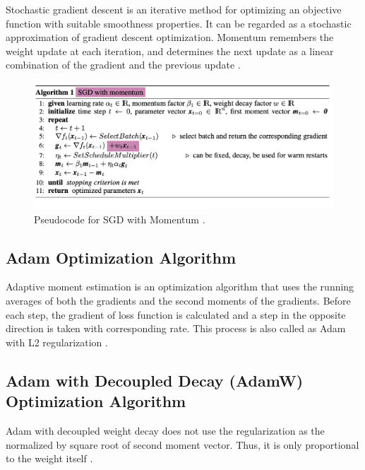 Stochastic gradient descent is an iterative method for optimizing an objective function with suitable smoothness properties. It can be regarded as a stochastic approximation of gradient descent optimization. Momentum remembers the weight update at each iteration, and determines the next update as a linear combination of the gradient and the previous update \cite{SGD_Momentum}.

\begin{figure}[h]
	\centering
	\includegraphics[width=\linewidth]{fig/sgd_momentum.png}
	\caption{Pseudocode for SGD with Momentum \cite{weight_decay_regularization}.}
	\label{sgd_momentum}
\end{figure}

\subsection{Adam Optimization Algorithm}

Adaptive moment estimation is an optimization algorithm that uses the running averages of both the gradients and the second moments of the gradients. Before each step, the gradient of loss function is calculated and a step in the opposite direction is taken with corresponding rate. This process is also called as Adam with L2 regularization \cite{Adam}.

\subsection{Adam with Decoupled Decay (AdamW) Optimization Algorithm}

Adam with decoupled weight decay does not use the regularization as the normalized by square root of second moment vector. Thus, it is only proportional to the weight itself \cite{Adam}.

